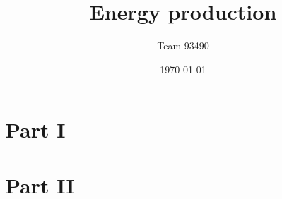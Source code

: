 \documentclass{article}
\title{Energy production}
\author{Team 93490}
\date{\today}
\begin{document}
\maketitle

\section{Part I}




\section{Part II}



\end{document}

